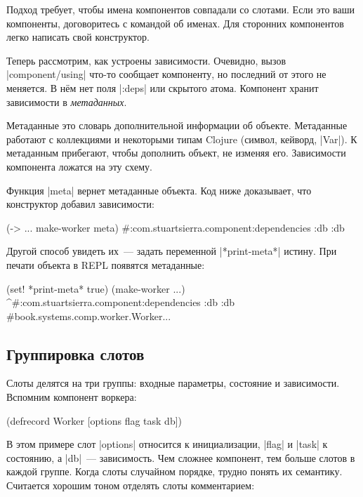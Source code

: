 Подход требует, чтобы имена компонентов совпадали со слотами. Если это ваши
компоненты, договоритесь с командой об именах. Для сторонних компонентов легко
написать свой конструктор.

Теперь рассмотрим, как устроены зависимости. Очевидно, вызов
\spverb|component/using| что-то сообщает компоненту, но последний от этого не
меняется. В н\"{е}м нет поля \spverb|:deps| или скрытого атома. Компонент хранит
зависимости в \emph{метаданных}.

Метаданные это словарь дополнительной информации об объекте. Метаданные работают
с коллекциями и некоторыми типам Clojure (символ, кейворд, \spverb|Var|). К
метаданным прибегают, чтобы дополнить объект, не изменяя его. Зависимости
компонента ложатся на эту схему.

Функция \spverb|meta| вернет метаданные объекта. Код ниже доказывает, что
конструктор добавил зависимости:

\begin{english}
  \begin{clojure}
(-> {...} make-worker meta)
#:com.stuartsierra.component{:dependencies {:db :db}}
  \end{clojure}
\end{english}

Другой способ увидеть их~--- задать переменной \spverb|*print-meta*| истину. При
печати объекта в REPL появятся метаданные:

\begin{english}
  \begin{clojure}
(set! *print-meta* true)
(make-worker {...})
^#:com.stuartsierra.component{:dependencies {:db :db}}
#book.systems.comp.worker.Worker{...}
  \end{clojure}
\end{english}

\subsection{Группировка слотов}

Слоты делятся на три группы: входные параметры, состояние и
зависимости. Вспомним компонент воркера:

\begin{english}
  \begin{clojure}
(defrecord Worker
    [options flag task db])
  \end{clojure}
\end{english}

В этом примере слот \spverb|options| относится к инициализации, \spverb|flag| и
\spverb|task| к состоянию, а \spverb|db|~--- зависимость. Чем сложнее компонент,
тем больше слотов в каждой группе. Когда слоты случайном порядке, трудно понять
их семантику. Считается хорошим тоном отделять слоты комментарием:

